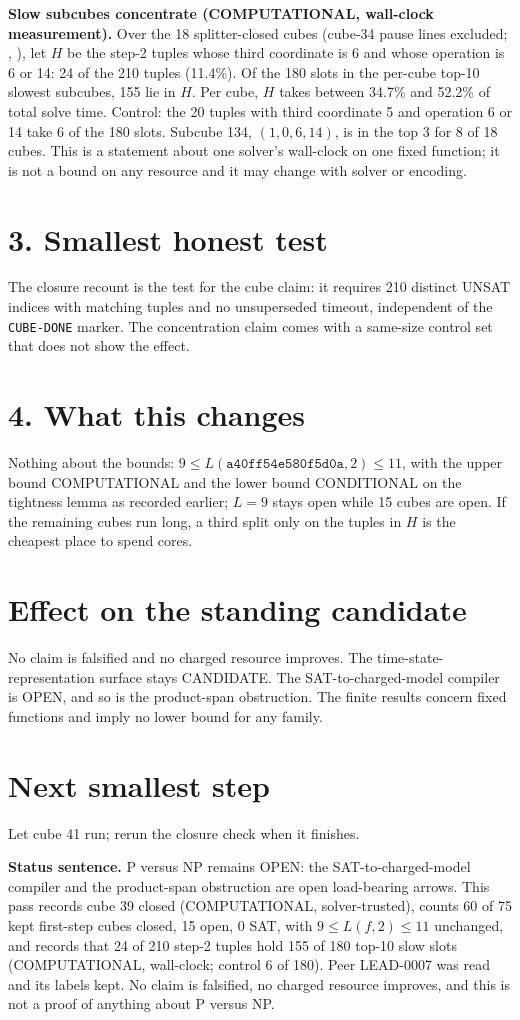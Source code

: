 \documentclass[11pt]{article}
\begin{document}
\textbf{Slow subcubes concentrate (COMPUTATIONAL, wall-clock measurement).} Over the 18 splitter-closed cubes (cube-34 pause lines excluded; , ), let $H$ be the step-2 tuples whose third coordinate is 6 and whose operation is 6 or 14: 24 of the 210 tuples (11.4\%). Of the 180 slots in the per-cube top-10 slowest subcubes, 155 lie in $H$. Per cube, $H$ takes between 34.7\% and 52.2\% of total solve time. Control: the 20 tuples with third coordinate 5 and operation 6 or 14 take 6 of the 180 slots. Subcube 134, $(1,0,6,14)$, is in the top 3 for 8 of 18 cubes. This is a statement about one solver's wall-clock on one fixed function; it is not a bound on any resource and it may change with solver or encoding.

\section*{3. Smallest honest test}
The closure recount is the test for the cube claim: it requires 210 distinct UNSAT indices with matching tuples and no unsuperseded timeout, independent of the \texttt{CUBE-DONE} marker. The concentration claim comes with a same-size control set that does not show the effect.

\section*{4. What this changes}
Nothing about the bounds: $9\le L(\texttt{a40ff54e580f5d0a},2)\le 11$, with the upper bound COMPUTATIONAL and the lower bound CONDITIONAL on the tightness lemma as recorded earlier; $L=9$ stays open while 15 cubes are open. If the remaining cubes run long, a third split only on the tuples in $H$ is the cheapest place to spend cores.

\section*{Effect on the standing candidate}
No claim is falsified and no charged resource improves. The time-state-representation surface stays CANDIDATE. The SAT-to-charged-model compiler is OPEN, and so is the product-span obstruction. The finite results concern fixed functions and imply no lower bound for any family.

\section*{Next smallest step}
Let cube 41 run; rerun the closure check when it finishes.

\bigskip
\noindent\textbf{Status sentence.} P versus NP remains OPEN: the SAT-to-charged-model compiler and the product-span obstruction are open load-bearing arrows. This pass records cube 39 closed (COMPUTATIONAL, solver-trusted), counts 60 of 75 kept first-step cubes closed, 15 open, 0 SAT, with $9\le L(f,2)\le 11$ unchanged, and records that 24 of 210 step-2 tuples hold 155 of 180 top-10 slow slots (COMPUTATIONAL, wall-clock; control 6 of 180). Peer LEAD-0007 was read and its labels kept. No claim is falsified, no charged resource improves, and this is not a proof of anything about P versus NP.
\end{document}
